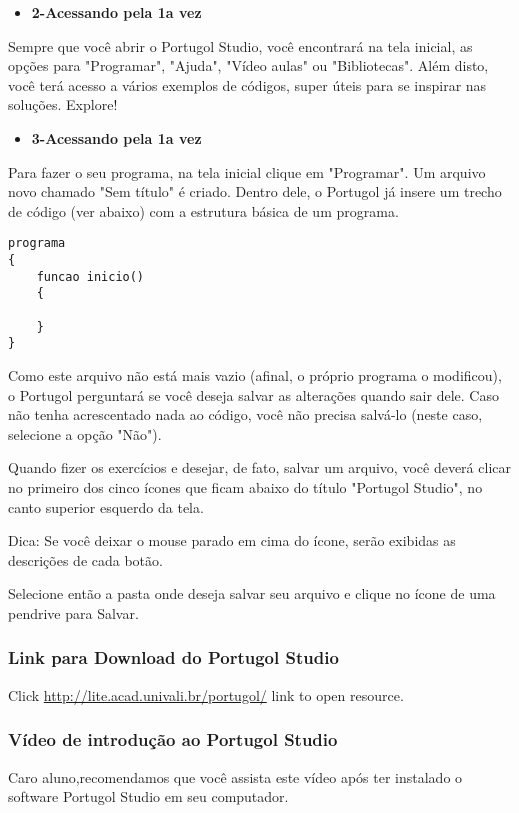 \documentclass{article}
\begin{document}
\begin{itemize}
    \item \textbf{2-Acessando pela 1a vez}
\end{itemize}
Sempre que você abrir o Portugol Studio, você encontrará na tela inicial, as opções para "Programar", "Ajuda", "Vídeo aulas" ou "Bibliotecas". Além disto, você terá acesso a vários exemplos de códigos, super úteis para se inspirar nas soluções. Explore!

\begin{itemize}
    \item \textbf{3-Acessando pela 1a vez}
\end{itemize}
Para fazer o seu programa, na tela inicial clique em "Programar". Um arquivo novo chamado "Sem título" é criado. Dentro dele, o Portugol já insere um trecho de código (ver abaixo) com a estrutura básica de um programa.

\begin{lstlisting}
programa
{
    funcao inicio()
    {

    }
}
\end{lstlisting}

Como este arquivo não está mais vazio (afinal, o próprio programa o modificou), o Portugol perguntará se você deseja salvar as alterações quando sair dele. Caso não tenha acrescentado nada ao código, você não precisa salvá-lo (neste caso, selecione a opção "Não").

Quando fizer os exercícios e desejar, de fato, salvar um arquivo, você deverá clicar no primeiro dos cinco ícones que ficam abaixo do título "Portugol Studio", no canto superior esquerdo da tela.

Dica: Se você deixar o mouse parado em cima do ícone, serão exibidas as descrições de cada botão.

Selecione então a pasta onde deseja salvar seu arquivo e clique no ícone de uma pendrive para Salvar.

\subsubsection{Link para Download do Portugol Studio}
Click \href{http://lite.acad.univali.br/portugol/}{http://lite.acad.univali.br/portugol/} link to open resource.

\subsubsection{Vídeo de introdução ao Portugol Studio}
Caro aluno,recomendamos que você assista este vídeo após ter instalado o software Portugol Studio em seu computador.
\end{document}
